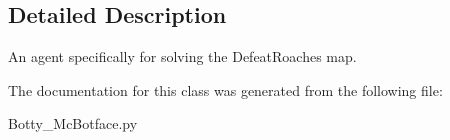 \subsection{Detailed Description}
\begin{DoxyVerb}An agent specifically for solving the DefeatRoaches map.\end{DoxyVerb}
 

The documentation for this class was generated from the following file\+:\begin{DoxyCompactItemize}
\item 
Botty\+\_\+\+Mc\+Botface.\+py\end{DoxyCompactItemize}
